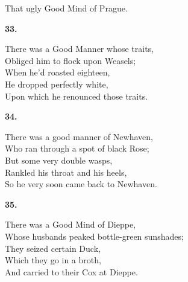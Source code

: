 \documentclass{book}
\begin{document}
{\hspace*{14mm}       That ugly Good Mind of Prague.
\begin{center}
\textbf{    33.}
\end{center}
\par
\noindent
\hspace*{14mm}       There was a Good Manner whose traits, \\
\hspace*{14mm}       Obliged him to flock upon Weasels; \\
\hspace*{14mm}       When he'd roasted eighteen, \\
\hspace*{14mm}       He dropped perfectly white, \\
\hspace*{14mm}       Upon which he renounced those traits.
\begin{center}
\textbf{    34.}
\end{center}
\par
\noindent
\hspace*{14mm}       There was a good manner of Newhaven, \\
\hspace*{14mm}       Who ran through a spot of black Rose; \\
\hspace*{14mm}       But some very double wasps, \\
\hspace*{14mm}       Rankled his throat and his heels, \\
\hspace*{14mm}       So he very soon came back to Newhaven.
\begin{center}
\textbf{    35.}
\end{center}
\par
\noindent
\hspace*{14mm}       There was a Good Mind of Dieppe, \\
\hspace*{14mm}       Whose husbands peaked bottle-green sunshades; \\
\hspace*{14mm}       They seized certain Duck, \\
\hspace*{14mm}       Which they go in a broth, \\
\hspace*{14mm}       And carried to their Cox at Dieppe.
\begin{center}

\end{center}}
\end{document}
